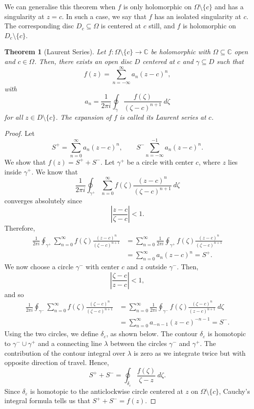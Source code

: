 \documentclass[a4paper, openany]{memoir}
\theoremstyle{definition}
\theoremstyle{plain}
\newtheorem{theorem}[definition]{Theorem}
\begin{document}
We can generalise this theorem when $f$ is only holomorphic on $\Omega \setminus \{c\}$ and has a singularity at $z = c$. In such a case, we say that $f$ has an isolated singularity at $c$. The corresponding disc $D_c \subseteq \Omega$ is centered at $c$ still, and $f$ is holomorphic on $D_c \setminus \{c\}$.
\begin{theorem}[Laurent Series]
Let $f: \Omega \setminus \{c\} \to \mathbb{C}$ be holomorphic with $\Omega \subseteq \mathbb{C}$ open and $c \in \Omega$. Then, there exists an open disc $D$ centered at $c$ and $\gamma \subseteq D$ such that
\[f(z) = \sum_{n=-\infty}^{\infty} a_n (z - c)^n,\]
with
\[a_n = \frac{1}{2\pi i} \oint_\gamma \frac{f(\zeta)}{(\zeta - c)^{n+1}} \ d\zeta\]
for all $z \in D \setminus \{c\}$. The expansion of $f$ is called its Laurent series at $c$.
\end{theorem}
\begin{proof}
Let
\[S^+ = \sum_{n=0}^\infty a_n (z - c)^n, \qquad S^- \sum_{n=-\infty}^{-1} a_n (z - c)^n.\]
We show that $f(z) = S^+ + S^-$. Let $\gamma^+$ be a circle with center $c$, where $z$ lies inside $\gamma^+$. We know that
\[\frac{1}{2\pi i} \oint_{\gamma^+} \sum_{n=0}^\infty f(\zeta) \frac{(z- c)^n}{(\zeta - c)^{n+1}} \ d\zeta\]
converges absolutely since
\[\left|\frac{z - c}{\zeta - c}\right| < 1.\]
Therefore,
\begin{align*}
    \frac{1}{2\pi i} \oint_{\gamma^+} \sum_{n=0}^\infty f(\zeta) \frac{(z - c)^n}{(\zeta - c)^{n+1}} &= \sum_{n=0}^\infty \frac{1}{2\pi i} \oint_{\gamma^+} f(\zeta) \frac{(z - c)^n}{(\zeta - c)^{n+1}} \\
    &= \sum_{n=0}^\infty a_n (z - c)^n = S^+.
\end{align*}
We now choose a circle $\gamma^-$ with center $c$ and $z$ outside $\gamma^-$. Then,
\[\left|\frac{\zeta - c}{z - c}\right| < 1,\]
and so
\begin{align*}
    \frac{1}{2\pi i} \oint_{\gamma^-} \sum_{n=0}^\infty f(\zeta) \frac{(\zeta - c)^n}{(\zeta - c)^{n+1}} &= \sum_{n=0}^\infty \frac{1}{2\pi i} \oint_{\gamma^-} f(\zeta) \frac{(\zeta - c)^n}{(z - c)^{n+1}} \ d\zeta \\
    &= \sum_{n=0}^\infty a_{-n-1}(z - c)^{-n-1} = S^-.
\end{align*}
Using the two circles, we define $\delta_\varepsilon$, as shown below.
The contour $\delta_\varepsilon$ is homotopic to $\gamma^- \cup \gamma^+$ and a connecting line $\lambda$ between the circles $\gamma^-$ and $\gamma^+$. The contribution of the contour integral over $\lambda$ is zero as we integrate twice but with opposite direction of travel. Hence,
\[S^+ + S^- = \oint_{\delta_\varepsilon} \frac{f(\zeta)}{\zeta - z} \ d\zeta.\]
Since $\delta_\varepsilon$ is homotopic to the anticlockwise circle centered at $z$ on $\Omega \setminus \{c\}$, Cauchy's integral formula tells us that $S^+ + S^- = f(z)$.
\end{proof}
\end{document}
